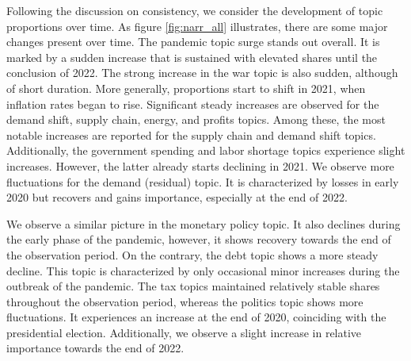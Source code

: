 Following the discussion on consistency, we consider the development of topic proportions over time. As figure \ref{fig:narr_all} illustrates, there are some major changes present over time. The pandemic topic surge stands out overall. It is marked by a sudden increase that is sustained with elevated shares until the conclusion of 2022. The strong increase in the war topic is also sudden, although of short duration. More generally, proportions start to shift in 2021, when inflation rates began to rise. Significant steady increases are observed for the demand shift, supply chain, energy, and profits topics. Among these, the most notable increases are reported for the supply chain and demand shift topics. Additionally, the government spending and labor shortage topics experience slight increases. However, the latter already starts declining in 2021. We observe more fluctuations for the demand (residual) topic. It is characterized by losses in early 2020 but recovers and gains importance, especially at the end of 2022.

We observe a similar picture in the monetary policy topic. It also declines during the early phase of the pandemic, however, it shows recovery towards the end of the observation period. On the contrary, the debt topic shows a more steady decline. This topic is characterized by only occasional minor increases during the outbreak of the pandemic. The tax topics maintained relatively stable shares throughout the observation period, whereas the politics topic shows more fluctuations. It experiences an increase at the end of 2020, coinciding with the presidential election. Additionally, we observe a slight increase in relative importance towards the end of 2022.

